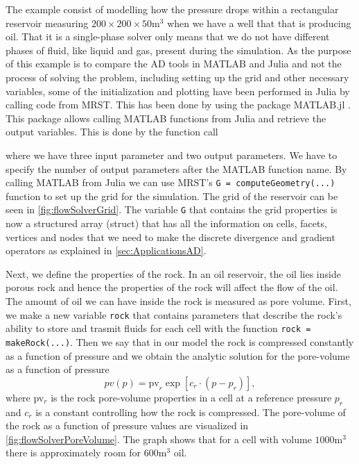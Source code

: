 The example consist of modelling how the pressure drops within a rectangular reservoir measuring $200\times 200 \times 50 \text{m}^3$ when we have a well that that is producing oil. That it is a single-phase solver only means that we do not have different phases of fluid, like liquid and gas, present during the simulation. As the purpose of this example is to compare the AD tools in MATLAB and Julia and not the process of solving the problem, including setting up the grid and other necessary variables, some of the initialization and plotting have been performed in Julia by calling code from MRST. This has been done by using the package MATLAB.jl \emph{\citep{MATLAB.jl}}. This package allows calling MATLAB functions from Julia and retrieve the output variables. This is done by the function call

where we have three input parameter and two output parameters. We have to specify the number of output parameters after the MATLAB function name.  By calling MATLAB from Julia we can use MRST's \texttt{G = computeGeometry(...)} function to set up the grid for the simulation. The grid of the reservoir can be seen in \autoref{fig:flowSolverGrid}. The variable \texttt{G} that contains the grid properties is now a structured array (struct) that has all the information on cells, facets, vertices and nodes that we need to make the discrete divergence and gradient operators as explained in \autoref{sec:ApplicationsAD}. 

Next, we define the properties of the rock. In an oil reservoir, the oil lies inside porous rock and hence the properties of the rock will affect the flow of the oil. The amount of oil we can have inside the rock is measured as pore volume. First, we make a new variable \texttt{rock} that contains parameters that describe the rock's ability to store and trasmit fluids for each cell with the function  \texttt{rock = makeRock(...)}. Then we say that in our model the rock is compressed constantly as a function of pressure and we obtain the analytic solution for the pore-volume as a function of pressure
\begin{equation}
    pv(p) = \text{pv}_r \exp[c_r\cdot(p-p_r)],
    \label{eq:poreVolume}
\end{equation}
where pv$_r$ is the rock pore-volume properties in a cell at a reference pressure $p_r$ and $c_r$ is a constant controlling how the rock is compressed. The pore-volume of the rock as a function of pressure values are visualized in \autoref{fig:flowSolverPoreVolume}. The graph shows that for a cell with volume $1000\text{m}^3$ there is approximately room for $600\text{m}^3$ oil.

